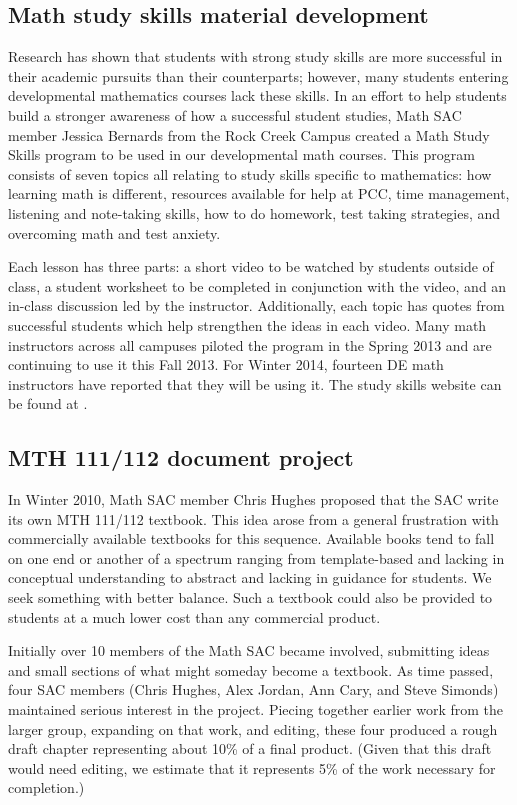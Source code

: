 \subsection{Math study skills material development}\label{cur:sub:studyskills}
Research has shown that students with strong study skills are more successful in their academic pursuits than their counterparts; however, many students entering developmental mathematics courses lack these skills.
In an effort to help students build a stronger awareness of how a successful student studies, Math SAC member Jessica Bernards from the Rock Creek Campus created a Math Study Skills program to be used in our developmental math courses.
This program consists of seven topics all relating to study skills specific to mathematics: how learning math is different, resources available for help at PCC, time management, listening and note-taking skills, how to do homework, test taking strategies, and overcoming math and test anxiety.

Each lesson has three parts: a short video to be watched by students outside of class, a student worksheet to be completed in conjunction with the video, and an in-class discussion led by the instructor.
Additionally, each topic has quotes from successful students which help strengthen the ideas in each video.
Many math instructors across all campuses piloted the program in the Spring 2013 and are continuing to use it this Fall 2013.
For Winter 2014, fourteen DE math instructors have reported that they will be using it.
The study skills website can be found at \cite{studyskills}.

\subsection{MTH 111/112 document project}\label{cur:sec:111/112doc}
In Winter 2010, Math SAC member Chris Hughes proposed that the SAC write its own MTH 111/112 textbook.
This idea arose from a general frustration with commercially available textbooks for this sequence.
Available books tend to fall on one end or another of a spectrum ranging from template-based and lacking in conceptual understanding to abstract and lacking in guidance for students.
We seek something with better balance.
Such a textbook could also be provided to students at a much lower cost than any commercial product.

Initially over 10 members of the Math SAC became involved, submitting ideas and small sections of what might someday become a textbook.
As time passed, four SAC members (Chris Hughes, Alex Jordan, Ann Cary, and Steve Simonds) maintained serious interest in the project.
Piecing together earlier work from the larger group, expanding on that work, and editing, these four produced a rough draft chapter representing about 10\% of a final product.
(Given that this draft would
need editing, we estimate that it represents 5\% of the work necessary for
completion.)

